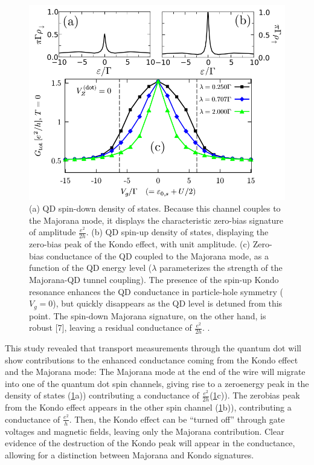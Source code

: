 \begin{figure}[t]
    \centering
    \includegraphics[scale=0.4]{IMAGES/Kondo-MajoranaCond.png}
    \caption{\label{Fig-Kondo-Majorana conductance}(a) QD spin-down
    density of states. Because this channel couples to the Majorana mode,
    it displays the characteristic zero-bias signature of amplitude
    $\frac{e^{2}}{2h}$. (b) QD spin-up density of states,
    displaying the zero-bias peak of the Kondo effect, with
    unit amplitude. (c) Zero-bias conductance of the QD coupled
    to the Majorana mode, as a function of the QD energy level ($\lambda$
    parameterizes the strength of the Majorana-QD tunnel coupling).
    The presence of the spin-up Kondo resonance enhances the
    QD conductance in particle-hole symmetry ($V_{g}=0$),
    but quickly disappears as the QD level is detuned from this point.
    The spin-down Majorana signature, on the other hand, is
    robust {[}7{]}, leaving a residual conductance of $\frac{e^{2}}{2h}$.
    \protect{}.}
\end{figure}

This study revealed that transport measurements
through the quantum dot will show contributions to the enhanced conductance
coming from the Kondo effect and the Majorana mode: The Majorana mode
at the end of the wire will migrate into one of the quantum dot spin channels,
giving rise to a zero\textendash energy peak in the density of states
(\ref{Fig-Kondo-Majorana conductance}a)) contributing a conductance
of $\frac{e^{2}}{2h}$(\ref{Fig-Kondo-Majorana conductance}c)). The
zero\textendash bias peak from the Kondo effect appears in the other
spin channel (\ref{Fig-Kondo-Majorana conductance}b)), contributing
a conductance of $\frac{e^{2}}{h}$. Then, the Kondo effect can be
\textquotedblleft turned off\textquotedblright{} through gate voltages
and magnetic fields, leaving only the Majorana contribution. Clear
evidence of the destruction of the Kondo peak will appear in the conductance,
allowing for a distinction between Majorana and Kondo signatures.\\



